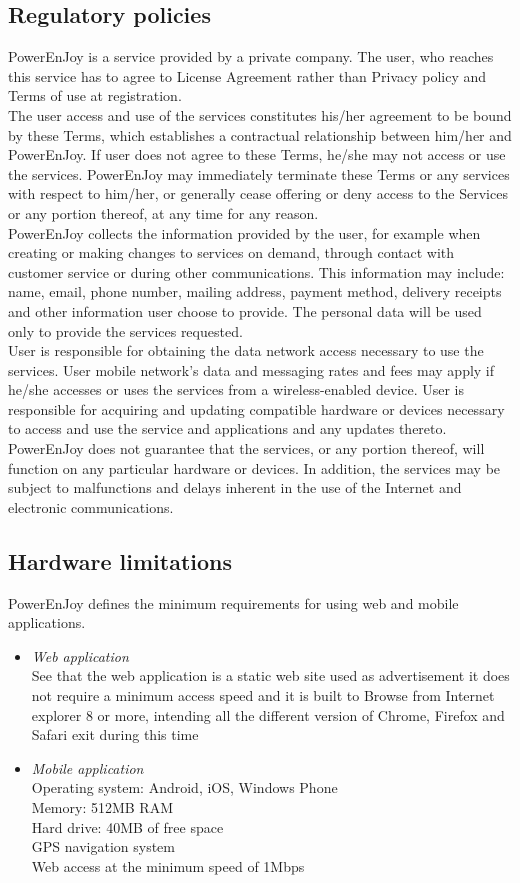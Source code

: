 \subsection{Regulatory policies}
PowerEnJoy is a service provided by a private company. The user, who reaches this service has to agree to License Agreement rather than Privacy policy and Terms of use at registration.\\
The user access and use of the services constitutes his/her agreement to be bound by these Terms, which establishes a contractual relationship between him/her and PowerEnJoy. If user does not agree to these Terms, he/she may not access or use the services. PowerEnJoy may immediately terminate these Terms or any services with respect to him/her, or generally cease offering or deny access to the Services or any portion thereof, at any time for any reason.\\
PowerEnJoy collects the information provided by the user, for example when creating or making changes to services on demand, through contact with customer service or during other communications. This information may include: name, email, phone number, mailing address, payment method, delivery receipts and other information user choose to provide. The personal data will be used only to provide the services requested.\\
User is responsible for obtaining the data network access necessary to use the services. User mobile network's data and messaging rates and fees may apply if he/she accesses or uses the services from a wireless-enabled device. User is responsible for acquiring and updating compatible hardware or devices necessary to access and use the service and applications and any updates thereto.\\
PowerEnJoy does not guarantee that the services, or any portion thereof, will function on any particular hardware or devices. In addition, the services may be subject to malfunctions and delays inherent in the use of the Internet and electronic communications.

\subsection{Hardware limitations}
PowerEnJoy defines the minimum requirements for using web and mobile applications.
\begin{itemize}
	\item \textit{Web application}\\
	See that the web application is a static web site used as advertisement it does not require a minimum access speed and it is built to Browse from Internet explorer 8 or more, intending all the different version of Chrome, Firefox and Safari exit during this time
	\item \textit{Mobile application}\\
	Operating system: Android, iOS, Windows Phone\\
	Memory: 512MB RAM\\
	Hard drive: 40MB of free space\\
	GPS navigation system\\
	Web access at the minimum speed of 1Mbps
\end{itemize}

